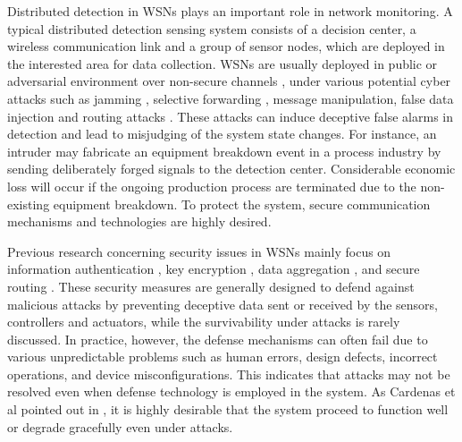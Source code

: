 \documentclass[journal]{IEEEtran}
\begin{document}
Distributed detection \cite{tenney1981detection} in WSNs plays an important role in network monitoring. A typical distributed detection sensing system consists of a decision center, a wireless communication link and a group of sensor nodes, which are deployed in the interested area for data collection.  WSNs are usually deployed in public or adversarial environment over non-secure channels \cite{alrajeh2013intrusion,bokareva2006wireless}, under various potential cyber attacks such as jamming \cite{li2013jamming}, selective forwarding \cite{yu2006detecting}, message manipulation\cite{he2013sats}, false data injection \cite{zhu2004interleaved} and routing attacks \cite{lu2005applying}. These attacks can induce deceptive false alarms in detection and lead to misjudging of the system state changes. For instance, an intruder may fabricate an equipment breakdown event in a process industry by sending deliberately forged signals to the detection center. Considerable economic loss will occur if the ongoing production process are terminated due to the non-existing equipment breakdown. To protect the system, secure communication mechanisms and technologies are highly desired.








Previous research concerning security issues in WSNs mainly focus on information authentication \cite{perrig2002spins,lu2012becan}, key encryption \cite{du2005pairwise,boneh2003identity}, data aggregation \cite{ozdemir2009secure,he2007pda}, and secure routing \cite{zhou1999securing,karlof2003secure}. These security measures are generally designed to defend against malicious attacks by preventing deceptive data sent or received by the sensors, controllers and actuators,  while the survivability under attacks is rarely discussed.   In practice, however, the defense mechanisms can often fail due to various unpredictable problems such as human errors, design defects, incorrect operations, and device misconfigurations. This indicates that attacks may not be resolved even when defense technology is employed in the system. As Cardenas et al  pointed out in \cite{cardenas2008secure}, it is highly desirable that the system proceed to function well or degrade gracefully even under attacks.
\end{document}
